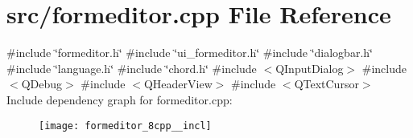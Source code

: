 \section{src/formeditor.cpp File Reference}
\label{formeditor_8cpp}
{\ttfamily \#include \char`\"{}formeditor.\+h\char`\"{}}\newline
{\ttfamily \#include \char`\"{}ui\+\_\+formeditor.\+h\char`\"{}}\newline
{\ttfamily \#include \char`\"{}dialogbar.\+h\char`\"{}}\newline
{\ttfamily \#include \char`\"{}language.\+h\char`\"{}}\newline
{\ttfamily \#include \char`\"{}chord.\+h\char`\"{}}\newline
{\ttfamily \#include $<$Q\+Input\+Dialog$>$}\newline
{\ttfamily \#include $<$Q\+Debug$>$}\newline
{\ttfamily \#include $<$Q\+Header\+View$>$}\newline
{\ttfamily \#include $<$Q\+Text\+Cursor$>$}\newline
Include dependency graph for formeditor.\+cpp\+:
\nopagebreak
\begin{figure}[H]
\begin{center}
\leavevmode
\texttt{[image: formeditor\_8cpp\_\_incl]}
\end{center}
\end{figure}

